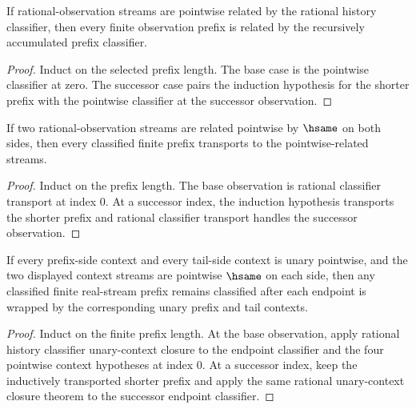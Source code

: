 \begin{theorem}
\label{thm:real-stream-classifier-prefix}
If rational-observation streams are pointwise related by the rational history classifier, then every finite observation prefix is related by the recursively accumulated prefix classifier.
\end{theorem}
\begin{proof}
Induct on the selected prefix length. The base case is the pointwise classifier at zero. The successor case pairs the induction hypothesis for the shorter prefix with the pointwise classifier at the successor observation.
\end{proof}

\begin{theorem}
\label{thm:real-stream-prefix-classifier-hsame-transport}
If two rational-observation streams are related pointwise by $\hsame$ on both
sides, then every classified finite prefix transports to the pointwise-related
streams.
\end{theorem}
\begin{proof}
Induct on the prefix length. The base observation is rational classifier
transport at index $0$. At a successor index, the induction hypothesis
transports the shorter prefix and rational classifier transport handles the
successor observation.
\end{proof}

\begin{theorem}
\label{thm:real-stream-prefix-unary-context-closed}
If every prefix-side context and every tail-side context is unary pointwise, and
the two displayed context streams are pointwise $\hsame$ on each side, then any
classified finite real-stream prefix remains classified after each endpoint is
wrapped by the corresponding unary prefix and tail contexts.
\end{theorem}
\begin{proof}
Induct on the finite prefix length. At the base observation, apply rational
history classifier unary-context closure to the endpoint classifier and the
four pointwise context hypotheses at index $0$. At a successor index, keep the
inductively transported shorter prefix and apply the same rational
unary-context closure theorem to the successor endpoint classifier.
\end{proof}

